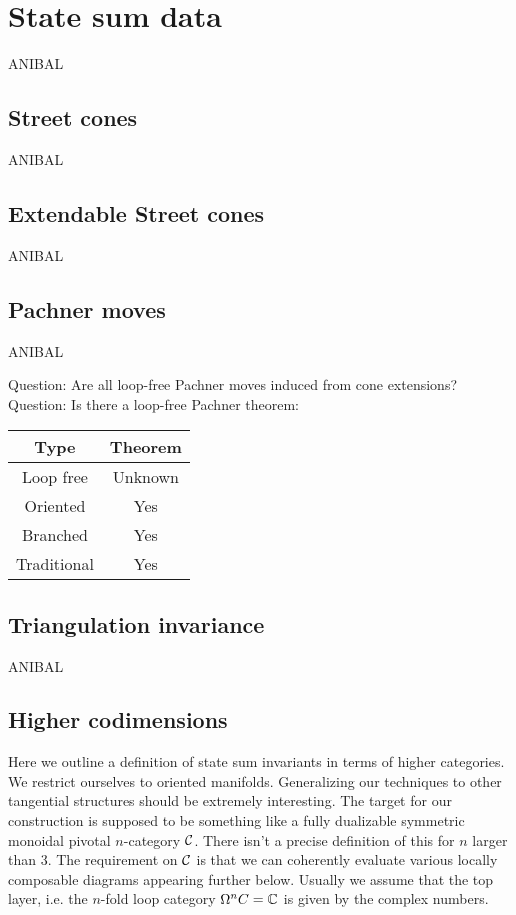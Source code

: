 
\section{State sum data}

ANIBAL

\subsection{Street cones}

ANIBAL

\subsection{Extendable Street cones}

ANIBAL

\subsection{Pachner moves}

ANIBAL

Question: Are all loop-free Pachner moves induced from cone extensions?
Question: Is there a loop-free Pachner theorem:
\begin{center}
	\begin{tabular}{|c|c|}
		\hline
		Type & Theorem \\ \hline
		Loop free & Unknown \\
		Oriented & Yes \\
		Branched & Yes \\
		Traditional & Yes \\ \hline
	\end{tabular}
\end{center}

\subsection{Triangulation invariance}

ANIBAL

\subsection{Higher codimensions}



\newpage

Here we outline a definition of state sum invariants in terms of higher categories.
We restrict ourselves to oriented manifolds.
Generalizing our techniques to other tangential structures should be extremely interesting.
The target for our construction is supposed to be something like a fully dualizable symmetric monoidal pivotal $n$-category $\mathcal{C}$.
There isn't a precise definition of this for $n$ larger than 3. The requirement on $\mathcal{C}$ is that we can coherently evaluate various locally composable diagrams appearing further below.
Usually we assume that the top layer, i.e.
the $n$-fold loop category $\Omega^n C = \mathbb{C} $ is given by the complex numbers.

